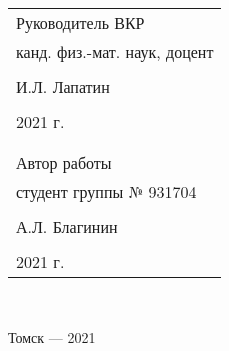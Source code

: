 \begin{flushright}\linespread{0.9}
	\normalsize{ 
		\begin{tabular}{@{}l@{}}
		Руководитель ВКР\\
		 канд. физ.-мат. наук, доцент\\\\ \underline{\hspace{3.5cm}} И.Л. Лапатин\\\\
		 \textquote{\underline{\hspace{1cm}}}\underline{\hspace{4cm}}2021 г.\\
		  \break
		  \\\\
		Автор работы\\
		  студент группы № 931704\\\\ \underline{\hspace{3.5cm}} А.Л. Благинин\\\\
		 \textquote{\underline{\hspace{1cm}}}\underline{\hspace{4cm}}2021 г.
		\end{tabular}	
	}\\

\end{flushright}
	\hfill \break
	\hfill \break
	\hfill \break
	\begin{center} Томск --- 2021 \end{center}
	\thispagestyle{empty} %
	\clearpage
